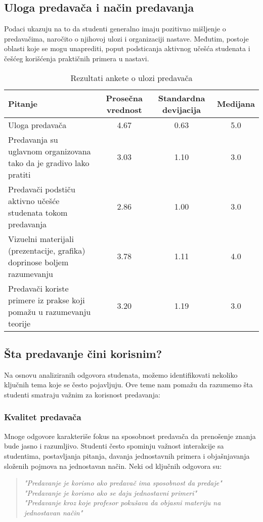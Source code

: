 \documentclass{article}
\begin{document}
\subsection{Uloga predavača i način predavanja}
Podaci ukazuju na to da studenti generalno imaju pozitivno mišljenje o predavačima, naročito o njihovoj ulozi i organizaciji nastave. Međutim, postoje oblasti koje se mogu unaprediti, poput podsticanja aktivnog učešća studenata i češćeg korišćenja praktičnih primera u nastavi.

\begin{table}[H]
\centering
\begin{tabular}{|l|c|c|c|}
\hline
\textbf{Pitanje} &
  \textbf{Prosečna vrednost} &
  \textbf{Standardna devijacija} &
  \textbf{Medijana} \\ \hline
\parbox[t]{3cm}{Uloga predavača} &
  4.67 &
  0.63 &
  5.0 \\ \hline
\parbox[t]{3cm}{Predavanja su uglavnom organizovana tako da je gradivo lako pratiti} &
  3.03 &
  1.10 &
  3.0 \\ \hline
\parbox[t]{3cm}{Predavači podstiču aktivno učešće studenata tokom predavanja} &
  2.86 &
  1.00 &
  3.0 \\ \hline
\parbox[t]{3cm}{Vizuelni materijali (prezentacije, grafika) doprinose boljem razumevanju} &
  3.78 &
  1.11 &
  4.0 \\ \hline
\parbox[t]{3cm}{Predavači koriste primere iz prakse koji pomažu u razumevanju teorije} &
  3.20 &
  1.19 &
  3.0 \\ \hline
\end{tabular}
\caption{Rezultati ankete o ulozi predavača}
\end{table}
\subsection{Šta predavanje čini korisnim?}

Na osnovu analiziranih odgovora studenata, možemo identifikovati nekoliko ključnih tema koje se često pojavljuju. Ove teme nam pomažu da razumemo šta studenti smatraju važnim za korisnost predavanja:

\subsubsection{Kvalitet predavača}
Mnoge odgovore karakteriše fokus na sposobnost predavača da prenošenje znanja bude jasno i razumljivo. Studenti često spominju važnost interakcije sa studentima, postavljanja pitanja, davanja jednostavnih primera i objašnjavanja složenih pojmova na jednostavan način. Neki od ključnih odgovora su:
\begin{quote}
    \textit{"Predavanje je korisno ako predavač ima sposobnost da predaje"} \\
    \textit{"Predavanje je korisno ako se daju jednostavni primeri"} \\
    \textit{"Predavanje kroz koje profesor pokušava da objasni materiju na jednostavan način"}
\end{quote}
\end{document}
